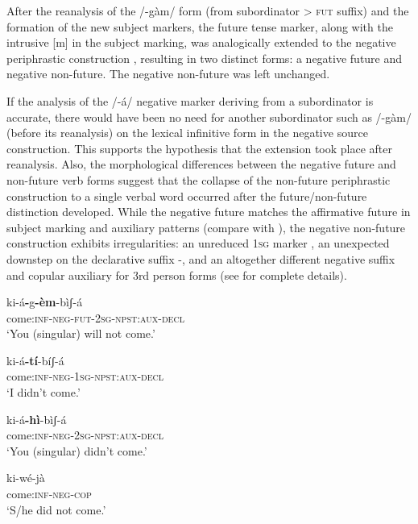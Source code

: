\documentclass[output=paper]{langsci/langscibook}
\begin{document}
After the reanalysis of the /-gàm/ form (from subordinator {>} \textsc{fut} suffix) and the formation of the new subject markers, the future tense marker, along with the intrusive [m] in the subject marking, was analogically extended to the negative periphrastic construction , resulting in two distinct forms: a negative future and negative non-future. The negative non-future was left unchanged. 

If the analysis of the /-á/ negative marker deriving from a subordinator is accurate, there would have been no need for another subordinator such as /-gàm/ (before its reanalysis) on the lexical infinitive form in the negative source construction. This supports the hypothesis that the extension took place after reanalysis. Also, the morphological differences between the negative future and non-future verb forms suggest that the collapse of the non-future periphrastic construction to a single verbal word occurred after the future/non-future distinction developed. While the negative future matches the affirmative future in subject marking and auxiliary patterns (compare  with ), the negative non-future construction exhibits irregularities: an unreduced \textsc{1sg} marker , an unexpected downstep on the declarative suffix -, and an altogether different negative suffix and copular auxiliary for 3rd person forms  (see \citealt[384-384]{Ahland2012} for complete details). 

\ea\label{ex:mahland:83}
\gll ki-á\textbf{{}-}g\textbf{{}-èm}{}-bìʃ-á     \\
come:\textsc{inf-neg-fut-2sg-npst:aux-decl} \\
\glt `You (singular) will not come.'
\z

\ea\label{ex:mahland:84}
\gll ki-á\textbf{{}-}\textbf{tí}{}-bíʃ-{\downstep}á  \\
come:\textsc{inf-neg-1sg-npst:aux-decl} \\
\glt `I didn't come.'
\z

\ea\label{ex:mahland:85}
\gll ki-á\textbf{{}-hì}-bìʃ-{\downstep}á  \\
come:\textsc{inf-neg-2sg-npst:aux-decl}\\
\glt `You (singular) didn't come.'
\z

\ea\label{ex:mahland:86}
\gll ki-wé-jà\\
come:\textsc{inf-neg-cop}\\
\glt `S/he did not come.'
\z
\end{document}
